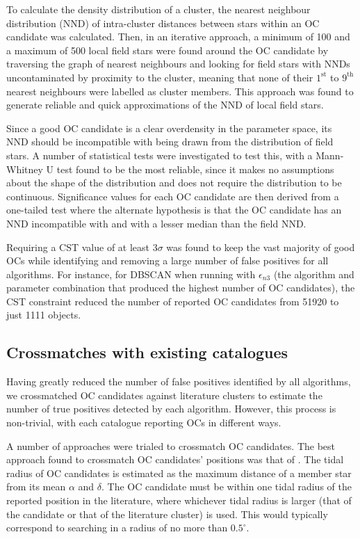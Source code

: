 To calculate the density distribution of a cluster, the nearest neighbour distribution (NND) of intra-cluster distances between stars within an OC candidate was calculated. Then, in an iterative approach, a minimum of 100 and a maximum of 500 local field stars were found around the OC candidate by traversing the graph of nearest neighbours and looking for field stars with NNDs uncontaminated by proximity to the cluster, meaning that none of their $1^\text{st}$ to $9^\text{th}$ nearest neighbours were labelled as cluster members. This approach was found to generate reliable and quick approximations of the NND of local field stars.

Since a good OC candidate is a clear overdensity in the parameter space, its NND should be incompatible with being drawn from the distribution of field stars. A number of statistical tests were investigated to test this, with a Mann-Whitney U test \citep{mann_test_1947} found to be the most reliable, since it makes no assumptions about the shape of the distribution and does not require the distribution to be continuous. Significance values for each OC candidate are then derived from a one-tailed test where the alternate hypothesis is that the OC candidate has an NND incompatible with and with a lesser median than the field NND.

Requiring a CST value of at least 3$\sigma$ was found to keep the vast majority of good OCs while identifying and removing a large number of false positives for all algorithms. For instance, for DBSCAN when running with $\epsilon_{n3}$ (the algorithm and parameter combination that produced the highest number of OC candidates), the CST constraint reduced the number of reported OC candidates from 51920 to just 1111 objects.


\subsection{Crossmatches with existing catalogues}\label{c2:sec:results_crossmatch}

Having greatly reduced the number of false positives identified by all algorithms, we crossmatched OC candidates against literature clusters to estimate the number of true positives detected by each algorithm. However, this process is non-trivial, with each catalogue reporting OCs in different ways.

A number of approaches were trialed to crossmatch OC candidates. The best approach found to crossmatch OC candidates' positions was that of \cite{liu_catalog_2019}. The tidal radius of OC candidates is estimated as the maximum distance of a member star from its mean $\alpha$ and $\delta$. The OC candidate must be within one tidal radius of the reported position in the literature, where whichever tidal radius is larger (that of the candidate or that of the literature cluster) is used. This would typically correspond to searching in a radius of no more than $0.5^\circ$.

